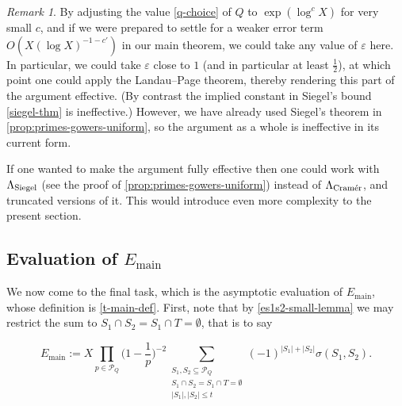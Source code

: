 \documentclass[11pt,reqno]{amsart}
\numberwithin{equation}{section}
\theoremstyle{definition}
\theoremstyle{remark}
\newtheorem*{remark}{Remark}
\newcommand{\mc}{\mathcal}
\newcommand{\eps}{\varepsilon}
\renewcommand{\le}{\leqslant}
\newcommand\siegel{{\textnormal{Siegel}}}
\newcommand\cramer{{\textnormal{Cram\'er}}}
\newcommand\main{{\textnormal{main}}}
\renewcommand\main{\operatorname{main}}
\begin{document}
\begin{remark}
By adjusting the value \cref{q-choice} of $Q$ to $\exp(\log^c X)$ for very small $c$, and if we were prepared to settle for a weaker error term $O(X (\log X)^{-1 - c'})$ in our main theorem, we could take any value of $\eps$ here. In particular, we could take $\eps$ close to $1$ (and in particular at least $\frac{1}{2}$), at which point one could apply the Landau--Page theorem, thereby rendering this part of the argument effective. (By contrast the implied constant in Siegel's bound \cref{siegel-thm} is ineffective.) However, we have already used Siegel's theorem in \cref{prop:primes-gowers-uniform}, so the argument as a whole is ineffective in its current form. 

If one wanted to make the argument fully effective then one could work with $\Lambda_{\siegel}$ (see the proof of \cref{prop:primes-gowers-uniform}) instead of $\Lambda_{\cramer}$, and truncated versions of it. This would introduce even more complexity to the present section. 
\end{remark}



\subsection{Evaluation of \texorpdfstring{$E_{\main}$}{}}

We now come to the final task, which is the asymptotic evaluation of $E_{\main}$, whose definition is \cref{t-main-def}. First, note that by \cref{es1s2-small-lemma} we may restrict the sum to $S_1 \cap S_2 = S_1 \cap T = \emptyset$, that is to say

\begin{equation}\label{t-main-def-rest} E_{\main} := X \prod_{p \in \mc{P}_Q} \Big(1 - \frac{1}{p}\Big)^{-2} \sum_{\substack{S_1, S_2 \subseteq \mc{P}_Q \\ S_1 \cap S_2 = S_1 \cap T = \emptyset \\ |S_1|, |S_2| \le t }} (-1)^{|S_1| + |S_2|} \sigma(S_1, S_2) .\end{equation}
\end{document}
